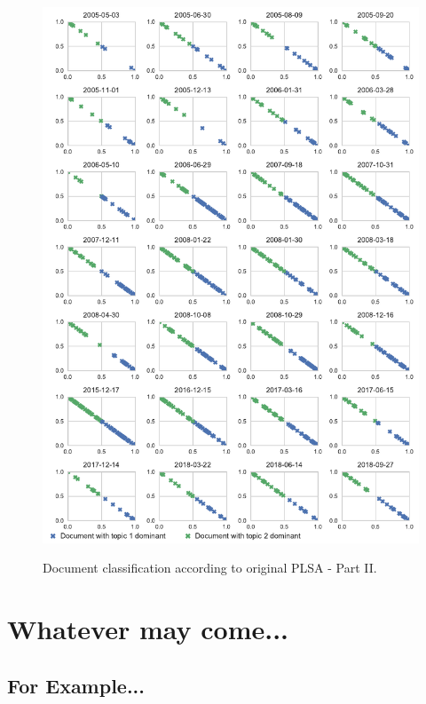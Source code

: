 \documentclass[11pt,a4paper,english,oneside]{book}
\numberwithin{equation}{chapter}
\begin{document}
\begin{figure}
	\caption{Document classification according to original PLSA - Part II.}
	\centering
	\includegraphics[scale=0.8]{Images/docsplit02_orig.pdf}
	\label{classdoc02}
\end{figure}



\renewcommand{\theequation}{C.\arabic{equation}}


\chapter{Whatever may come...}



\section{For Example... }
\end{document}

